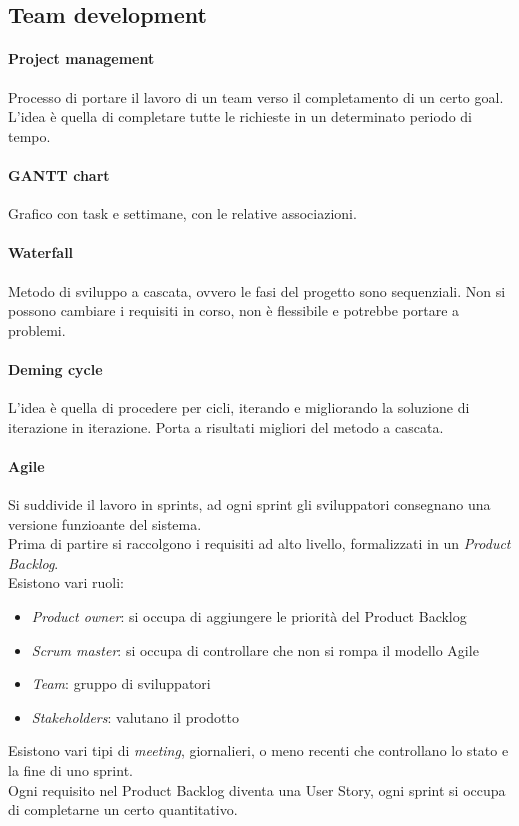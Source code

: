 \subsection{Team development}
\paragraph{Project management}
Processo di portare il lavoro di un team verso il completamento di un certo goal.
L'idea è quella di completare tutte le richieste in un determinato periodo di tempo.

\paragraph{GANTT chart}
Grafico con task e settimane, con le relative associazioni.

\paragraph{Waterfall}
Metodo di sviluppo a cascata, ovvero le fasi del progetto sono sequenziali.
Non si possono cambiare i requisiti in corso, non è flessibile e potrebbe 
portare a problemi.

\paragraph{Deming cycle}
L'idea è quella di procedere per cicli, iterando e migliorando la soluzione
di iterazione in iterazione. Porta a risultati migliori del metodo a cascata.

\paragraph{Agile}
Si suddivide il lavoro in sprints, ad ogni sprint gli sviluppatori consegnano una versione
funzioante del sistema.\\
Prima di partire si raccolgono i requisiti ad alto livello, formalizzati in un \emph{Product Backlog}.\\
Esistono vari ruoli:
\begin{itemize}
    \item \emph{Product owner}: si occupa di aggiungere le priorità del Product Backlog
    \item \emph{Scrum master}: si occupa di controllare che non si rompa il modello Agile
    \item \emph{Team}: gruppo di sviluppatori
    \item \emph{Stakeholders}: valutano il prodotto
\end{itemize}
Esistono vari tipi di \emph{meeting}, giornalieri, o meno recenti che controllano lo stato e la fine 
di uno sprint.\\
Ogni requisito nel Product Backlog diventa una User Story, ogni sprint si occupa di completarne
un certo quantitativo.
